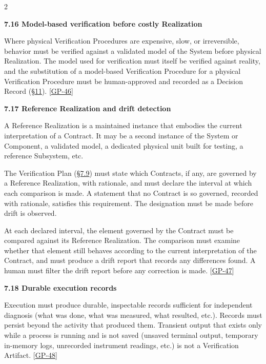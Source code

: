 \begin{multicols}{2}
\hypertarget{nss-7.16}{}

\par\smallskip\noindent\textbf{7.16 Model-based verification before costly Realization}\par\nopagebreak

Where physical Verification Procedures are expensive, slow, or irreversible, behavior must be verified against a validated model of the System before physical Realization. The model used for verification must itself be verified against reality, and the substitution of a model-based Verification Procedure for a physical Verification Procedure must be human-approved and recorded as a Decision Record (\hyperlink{nss-11}{\S11}). [\hyperlink{gp-46}{GP-46}]

\hypertarget{nss-7.17}{}

\par\smallskip\noindent\textbf{7.17 Reference Realization and drift detection}\par\nopagebreak

A Reference Realization is a maintained instance that embodies the current interpretation of a Contract. It may be a second instance of the System or Component, a validated model, a dedicated physical unit built for testing, a reference Subsystem, etc.

The Verification Plan (\hyperlink{nss-7.9}{\S7.9}) must state which Contracts, if any, are governed by a Reference Realization, with rationale, and must declare the interval at which each comparison is made. A statement that no Contract is so governed, recorded with rationale, satisfies this requirement. The designation must be made before drift is observed.

At each declared interval, the element governed by the Contract must be compared against its Reference Realization. The comparison must examine whether that element still behaves according to the current interpretation of the Contract, and must produce a drift report that records any differences found. A human must filter the drift report before any correction is made. [\hyperlink{gp-47}{GP-47}]

\hypertarget{nss-7.18}{}

\par\smallskip\noindent\textbf{7.18 Durable execution records}\par\nopagebreak

Execution must produce durable, inspectable records sufficient for independent diagnosis (what was done, what was measured, what resulted, etc.). Records must persist beyond the activity that produced them. Transient output that exists only while a process is running and is not saved (unsaved terminal output, temporary in-memory logs, unrecorded instrument readings, etc.) is not a Verification Artifact. [\hyperlink{gp-48}{GP-48}]


\end{multicols}
